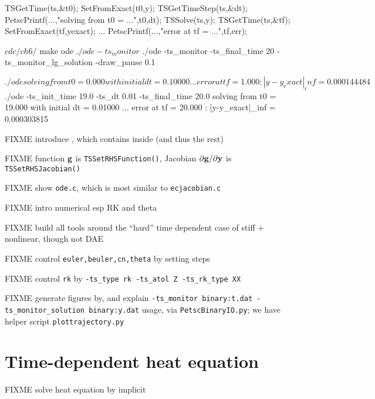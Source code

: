 \begin{code}
  TSGetTime(ts,&t0);
  SetFromExact(t0,y);
  TSGetTimeStep(ts,&dt);
  PetscPrintf(...,"solving from t0 = ...",t0,dt);
  TSSolve(ts,y);
  TSGetTime(ts,&tf);
  SetFromExact(tf,yexact);
  ...
  PetscPrintf(...,"error at tf = ...",tf,err);
\end{code}


\begin{cline}
$ cd c/ch6/
$ make ode
$ ./ode -ts_monitor
$ ./ode -ts_monitor -ts_final_time 20 -ts_monitor_lg_solution -draw_pause 0.1
\end{cline}

\begin{cline}
$ ./ode 
solving from t0 = 0.000 with initial dt = 0.10000 ...
error at tf = 1.000 :  |y-y_exact|_inf = 0.000144484
$ ./ode -ts_init_time 19.0 -ts_dt 0.01 -ts_final_time 20.0
solving from t0 = 19.000 with initial dt = 0.01000 ...
error at tf = 20.000 :  |y-y_exact|_inf = 0.000303815
\end{cline}

FIXME introduce \pTS, which contains \pSNES inside (and thus the rest)

FIXME function $\mathbf{g}$ is \texttt{TSSetRHSFunction()}, Jacobian $\partial \mathbf{g}/\partial \mathbf{y}$ is \texttt{TSSetRHSJacobian()}

FIXME show \texttt{ode.c}, which is most similar to \texttt{ecjacobian.c}

FIXME intro numerical esp RK and theta \citep{AscherPetzold1998}

FIXME build all tools around the ``hard'' time dependent case of stiff + nonlinear, though not DAE

FIXME control \texttt{euler,beuler,cn,theta} by setting steps

FIXME control \texttt{rk} by \texttt{-ts\_type rk -ts\_atol Z -ts\_rk\_type XX}

FIXME generate figures by, and explain \texttt{-ts\_monitor binary:t.dat -ts\_monitor\_solution binary:y.dat} usage, via \texttt{PetscBinaryIO.py}; we have helper script \texttt{plottrajectory.py}


\section{Time-dependent heat equation}

FIXME solve heat equation by implicit

